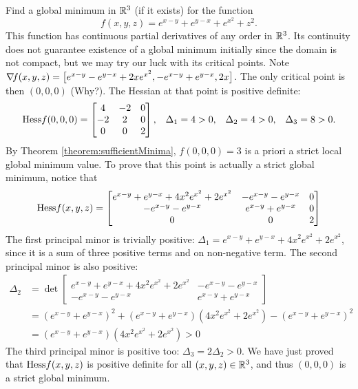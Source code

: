\begin{example}
Find a global minimum in $\mathbb{R}^3$ (if it exists) for the function 
\begin{equation*}
f(x,y,z)=e^{x-y} + e^{y-x} + e^{x^2}+z^2.
\end{equation*}
This function has continuous partial derivatives of any order in $\mathbb{R}^3$. Its continuity does not guarantee existence of a global minimum initially since the domain is not compact, but we may try our luck with its critical points.  Note $\mathop{\nabla\! {f}}(x,y,z) = \big[ e^{x-y} - e^{y-x} + 2xe^{x^2}, -e^{x-y}+e^{y-x}, 2x \big]$.  The only critical point is then $(0,0,0)$ (Why?). The Hessian at that point is positive definite:
\begin{align*}
&&\mathop{\mathrm{Hess}{f}}(0,0,0) &= \begin{bmatrix} 4 & -2 & 0 \\ -2 & 2 & 0 \\ 0 & 0 & 2 \end{bmatrix}, &
\Delta_1 &= 4 > 0, & \Delta_2 &= 4 >0, &\Delta_3 &= 8 > 0.
\end{align*}
By Theorem \ref{theorem:sufficientMinima}, $f(0,0,0)=3$ is a priori a strict local global minimum value.  To prove that this point is actually a strict global minimum, notice that 
\begin{equation*}
\mathop{\mathrm{Hess}{f}}(x,y,z)= \begin{bmatrix} 
e^{x-y}+e^{y-x}+4x^2e^{x^2}+2e^{x^2} & -e^{x-y}-e^{y-x} & 0 \\
-e^{x-y}-e^{y-x} & e^{x-y}+e^{y-x} & 0 \\
0 & 0 & 2 
\end{bmatrix}
\end{equation*}
The first principal minor is trivially positive: $\Delta_1 = e^{x-y}+e^{y-x}+4x^2e^{x^2}+2e^{x^2}$, since it is a sum of three positive terms and on non-negative term.  The second principal minor is also positive:
\begin{align*}
\Delta_2 &= \det \begin{bmatrix} e^{x-y}+e^{y-x}+4x^2e^{x^2}+2e^{x^2} & -e^{x-y}-e^{y-x} \\ -e^{x-y}-e^{y-x} & e^{x-y}+e^{y-x} \end{bmatrix} \\
&= (e^{x-y}+e^{y-x})^2 + (e^{x-y}+e^{y-x})(4x^2e^{x^2}+2e^{x^2}) - (e^{x-y}+e^{y-x})^2 \\
&= (e^{x-y}+e^{y-x})(4x^2e^{x^2}+2e^{x^2}) > 0 
\end{align*}
The third principal minor is positive too: $\Delta_3 = 2\Delta_2 > 0$.  We have just proved that $\mathop{\mathrm{Hess}{f}}(x,y,z)$ is positive definite for all $(x,y,z) \in \mathbb{R}^3$, and thus $(0,0,0)$ is a strict global minimum.
\end{example}

